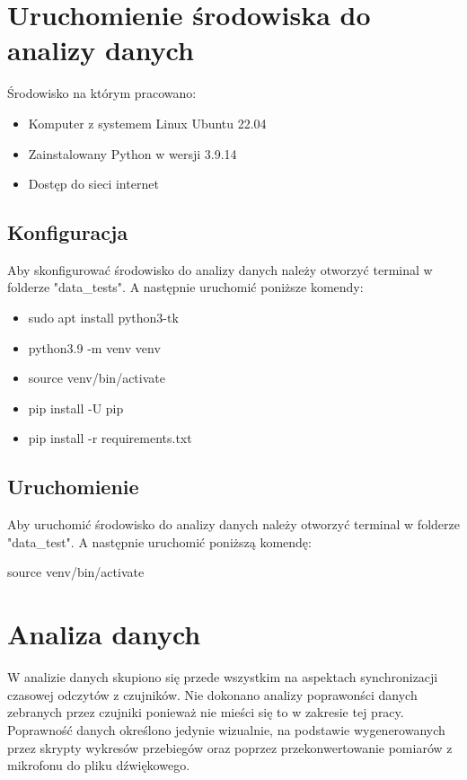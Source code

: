 \documentclass[12pt,oneside,a4paper]{book}
\theoremstyle{break}
\begin{document}
\section{Uruchomienie środowiska do analizy danych}
    Środowisko na którym pracowano:
    \begin{itemize}
        \item Komputer z systemem Linux Ubuntu 22.04
        \item Zainstalowany Python w wersji 3.9.14
        \item Dostęp do sieci internet
    \end{itemize}

\subsection{Konfiguracja}
Aby skonfigurować środowisko do analizy danych należy otworzyć terminal w folderze "data\_tests".
A następnie uruchomić poniższe komendy:

\begin{itemize}
    \item sudo apt install python3-tk
    \item python3.9 -m venv venv
    \item source venv/bin/activate
    \item pip install -U pip
    \item pip install -r requirements.txt
\end{itemize}

\subsection{Uruchomienie}
Aby uruchomić środowisko do analizy danych należy otworzyć terminal w folderze "data\_test".
A następnie uruchomić poniższą komendę:\\
\par source venv/bin/activate

\section{Analiza danych}
W analizie danych skupiono się przede wszystkim na aspektach synchronizacji czasowej odczytów
z czujników. Nie dokonano analizy poprawonści danych zebranych przez czujniki ponieważ nie mieści
się to w zakresie tej pracy. Poprawność danych określono jedynie wizualnie, na podstawie 
wygenerowanych przez skrypty wykresów przebiegów oraz poprzez przekonwertowanie pomiarów z mikrofonu
do pliku dźwiękowego.
\end{document}
